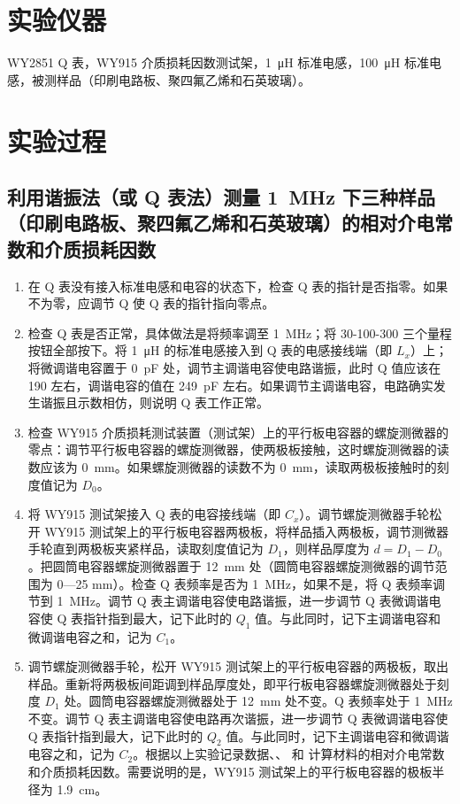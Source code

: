 \documentclass[a4paper,utf8]{article}
\begin{document}
\section{实验仪器}%
    WY2851 Q 表，WY915 介质损耗因数测试架，\SI{1}{\micro\henry} 标准电感，\SI{100}{\micro\henry} 标准电感，被测样品（印刷电路板、聚四氟乙烯和石英玻璃）。

\section{实验过程}%
    \subsection{利用谐振法（或 Q 表法）测量 \SI{1}{\mega\hertz} 下三种样品（印刷电路板、聚四氟乙烯和石英玻璃）的相对介电常数和介质损耗因数}
    \begin{enumerate}
        \item 在 Q 表没有接入标准电感和电容的状态下，检查 Q 表的指针是否指零。如果不为零，应调节 Q 使 Q 表的指针指向零点。
        \item 检查 Q 表是否正常，具体做法是将频率调至 \SI{1}{\mega\hertz}；将 30-100-300 三个量程按钮全部按下。将 \SI{1}{\micro\henry} 的标准电感接入到 Q 表的电感接线端（即 $L_x$）上；将微调谐电容置于 \SI{0}{\pico\farad} 处，调节主调谐电容使电路谐振，此时 Q 值应该在 190 左右，调谐电容的值在 \SI{249}{\pico\farad} 左右。如果调节主调谐电容，电路确实发生谐振且示数相仿，则说明 Q 表工作正常。
        \item 检查 WY915 介质损耗测试装置（测试架）上的平行板电容器的螺旋测微器的零点：调节平行板电容器的螺旋测微器，使两极板接触，这时螺旋测微器的读数应该为 \SI{0}{\milli\metre}。如果螺旋测微器的读数不为 \SI{0}{\milli\metre}，读取两极板接触时的刻度值记为 $D_0$。
        \item 将 WY915 测试架接入 Q 表的电容接线端（即 $C_x$）。调节螺旋测微器手轮松开 WY915 测试架上的平行板电容器两极板，将样品插入两极板，调节测微器手轮直到两极板夹紧样品，读取刻度值记为 $D_1$，则样品厚度为 $d = D_1 - D_0$。把圆筒电容器螺旋测微器置于 \SI{12}{\milli\metre} 处（圆筒电容器螺旋测微器的调节范围为 0—25 \unit{\milli\metre}）。检查 Q 表频率是否为 \SI{1}{\mega\hertz}，如果不是，将 Q 表频率调节到 \SI{1}{\mega\hertz}。调节 Q 表主调谐电容使电路谐振，进一步调节 Q 表微调谐电容使 Q 表指针指到最大，记下此时的 $Q_1$ 值。与此同时，记下主调谐电容和微调谐电容之和，记为 $C_1$。
        \item 调节螺旋测微器手轮，松开 WY915 测试架上的平行板电容器的两极板，取出样品。重新将两极板间距调到样品厚度处，即平行板电容器螺旋测微器处于刻度 $D_1$ 处。圆筒电容器螺旋测微器处于 \SI{12}{\milli\metre} 处不变。Q 表频率处于 \SI{1}{\mega\hertz} 不变。调节 Q 表主调谐电容使电路再次谐振，进一步调节 Q 表微调谐电容使 Q 表指针指到最大，记下此时的 $Q_2$ 值。与此同时，记下主调谐电容和微调谐电容之和，记为 $C_2$。根据以上实验记录数据、、 和 计算材料的相对介电常数和介质损耗因数。需要说明的是，WY915 测试架上的平行板电容器的极板半径为 \SI{1.9}{\centi\metre}。
    \end{enumerate}
\end{document}
